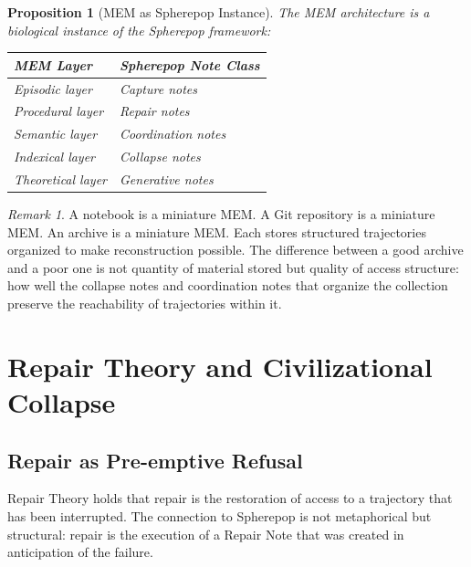 \documentclass[12pt, a4paper, openany]{book}
\theoremstyle{plain}
\newtheorem{proposition}[theorem]{Proposition}
\theoremstyle{definition}
\theoremstyle{remark}
\newtheorem{remark}[theorem]{Remark}
\begin{document}
\begin{proposition}[MEM as Spherepop Instance]
The MEM architecture is a biological instance of the Spherepop framework:
\begin{center}
\begin{tabular}{ll}
\toprule
MEM\textbar8 Layer & Spherepop Note Class \\
\midrule
Episodic layer & Capture notes \\
Procedural layer & Repair notes \\
Semantic layer & Coordination notes \\
Indexical layer & Collapse notes \\
Theoretical layer & Generative notes \\
\bottomrule
\end{tabular}
\end{center}
\end{proposition}

\begin{remark}
A notebook is a miniature MEM. A Git repository is a miniature
MEM. An archive is a miniature MEM. Each stores structured
trajectories organized to make reconstruction possible. The difference between
a good archive and a poor one is not quantity of material stored but quality
of access structure: how well the collapse notes and coordination notes that
organize the collection preserve the reachability of trajectories within it.
\end{remark}

\chapter{Repair Theory and Civilizational Collapse}

\section{Repair as Pre-emptive Refusal}

Repair Theory holds that repair is the restoration of access to a trajectory
that has been interrupted. The connection to Spherepop is not metaphorical but
structural: repair is the execution of a Repair Note that was created in
anticipation of the failure.
\end{document}
